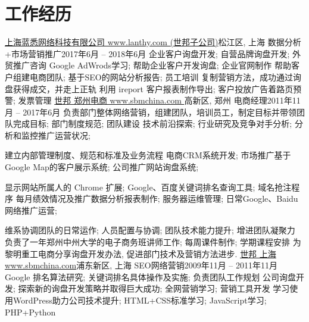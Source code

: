 \section{\textbf{工作经历}}
  \resumeSubHeadingListStart
    \resumeSubheading
      {\href{http://www.lanthy.com/}{上海蓝悉网络科技有限公司 www.lanthy.com (世邦子公司)}}{松江区, 上海}
      {数据分析+市场营销推广}{2017年6月 -- 2018年6月}
      \resumeItemListStart
          {企业客户询盘开发; 自营品牌询盘开发; 外贸推广咨询}
          {Google AdWrods学习; 帮助企业客户开发询盘; 企业官网制作}
          {帮助客户组建电商团队; 基于SEO的网站分析报告; 员工培训}
          {复制营销方法，成功通过询盘获得成交，并走上正轨}
          {利用 ireport 客户报表制作导出; 客户投放广告着路页预警; 发票管理}
      \resumeItemListEnd
    \resumeSubheading
      {\href{http://www.sbmchina.com/}{世邦 郑州电商 www.sbmchina.com }}{高新区, 郑州}
      {电商经理}{2011年11月 -- 2017年6月}
      \resumeItemListStart
          {负责部门整体网络营销，组建团队，培训员工，制定目标并带领团队完成目标; 部门制度规范; 团队建设}
          {技术前沿探索; 行业研究及竞争对手分析; 分析和监控推广运营状况;}

          {建立内部管理制度、规范和标准及业务流程}
          {电商CRM系统开发; 市场推广基于Google Map的客户展示系统; 公司推广网站询盘系统; }

          {显示网站所属人的 Chrome 扩展; Google、百度关键词排名查询工具; 域名抢注程序 }
          {每月绩效情况及推广数据分析报表制作; 服务器运维管理; 日常Google、Baidu网络推广运营;}

          {维系协调团队的日常运作; 人员配置与协调; 团队技术能力提升; 增进团队凝聚力}
          {负责了一年郑州中州大学的电子商务班讲师工作; 每周课件制作; 学期课程安排}
          {为黎明重工电商分享询盘开发办法, 促进部门技术及营销方法进步.}
      \resumeItemListEnd
    \resumeSubheading
      {\href{http://www.shibangchina.com/}{世邦 上海 www.sbmchina.com}}{浦东新区, 上海}
      {SEO网络营销}{2009年11月 -- 2011年11月}
      \resumeItemListStart
          {Google 排名算法研究; 关键词排名具体操作及实施; 负责团队工作规划}
          {公司询盘开发; 探索新的询盘开发策略并取得巨大成功; 全网营销学习; 营销工具开发}
          {学习使用WordPress助力公司技术提升; HTML+CSS标准学习; JavaScript学习; PHP+Python}
      \resumeItemListEnd
  \resumeSubHeadingListEnd
